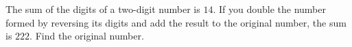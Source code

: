 The sum of the digits of a two-digit number is $14$. If you double the number formed by reversing its digits and add the result to the original number, the sum is $222$. Find the original number.
